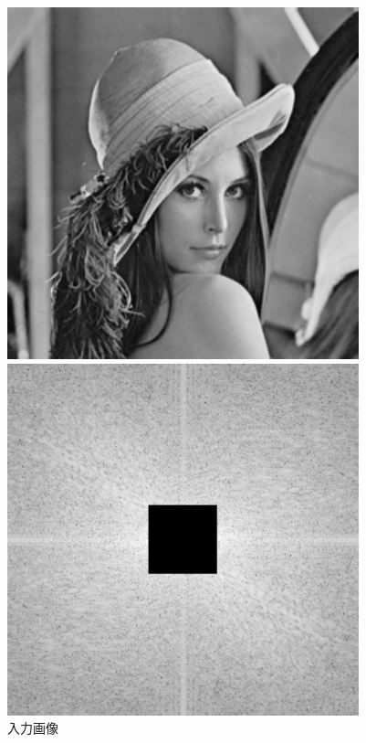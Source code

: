 \iffigure
\begin{figure}[h]
  \centering
  \begin{minipage}{.25\hsize}
    \includegraphics[clip, width=\textwidth]{figure/Lenna.pdf}
    \caption{入力画像}
    \label{fig:high_input}
  \end{minipage}
  \begin{minipage}{.25\hsize}
    \includegraphics[clip, width=\textwidth]{figure/high_pass_dft_2d.pdf}

\end{minipage}
\end{figure}
